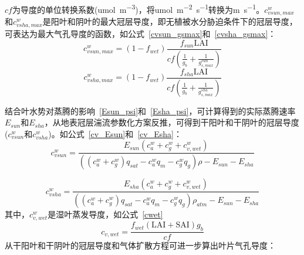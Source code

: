 $cf$为导度的单位转换系数(\unit{umol.m^{-3}})，将\unit{umol.m^{-2}.s^{-1}}转换为\unit{m.s^{-1}}。$c_{vsun,max}^{w}$和$c_{vsha,max}^{w}$是阳叶和阴叶的最大冠层导度，即无植被水分胁迫条件下的冠层导度，可表达为最大气孔导度的函数，如公式~\eqref{cvsun_gsmax}和~\eqref{cvsha_gsmax}：
\begin{equation}\label{cvsun_gsmax}
    c_{vsun,max}^{w}=\left(1-f_{wet}\right)\frac{f_{sun}\text{LAI}}{cf\left(\frac{1}{g_b}+\frac{1}{g_{s,max}^{sun}}\right)}
\end{equation}
%
\begin{equation}\label{cvsha_gsmax}
    c_{vsha,max}^{w}=\left(1-f_{wet}\right)\frac{f_{sha}\text{LAI}}{cf\left(\frac{1}{g_b}+\frac{1}{g_{s,max}^{sha}}\right)}
\end{equation}

结合叶水势对蒸腾的影响~\eqref{Esun_psi}和~\eqref{Esha_psi}，可计算得到的实际蒸腾速率$E_{sun}$和$E_{sha}$，从地表冠层湍流参数化方案反推，可得到干阳叶和干阴叶的冠层导度 ($c_{vsun}^{w}$和$c_{vsha}^{w}$)。如公式~\eqref{cv_Esun}和~\eqref{cv_Esha}：
\begin{equation}\label{cv_Esun}c_{vsun}^{w}=\frac{E_{sun}\left(c_a^w+c_g^w+c_{v,wet}^{w}\right)}{\left(\left(c_a^w+c_g^w\right)q_{sat}-c_a^w q_m - c_g^w q_g\right)\rho-E_{sun}-E_{sha}}
\end{equation}

\begin{equation}\label{cv_Esha}
c_{vsha}^{w}=\frac{E_{sha}\left(c_a^w+c_g^w+c_{v,wet}^{w}\right)}{\left(\left(c_a^w+c_g^w\right)q_{sat}-c_a^w q_m - c_g^w q_g\right)\rho_{atm}-E_{sun}-E_{sha}}
\end{equation}
其中，$c_{v,wet}^{w}$是湿叶蒸发导度，如公式~\eqref{cwet}
\begin{equation}\label{cwet}
c_{v,wet}=\frac{f_{wet}\left(\text{LAI}+\text{SAI}\right)g_b}{cf}
\end{equation}
从干阳叶和干阴叶的冠层导度和气体扩散方程可进一步算出叶片气孔导度：
%

